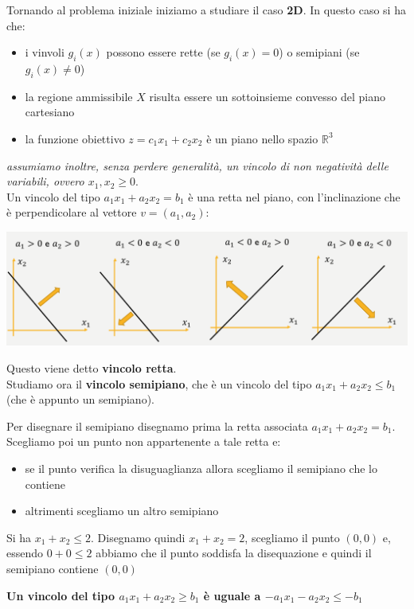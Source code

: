 \message{ !name(ro.tex)}\documentclass[a4paper,12pt, oneside]{book}
\begin{document}
Tornando al problema iniziale iniziamo a studiare il caso
\textbf{2D}. In questo caso si ha che:
\begin{itemize}
  \item i vinvoli $g_i(x)$ possono essere rette (se $g_i(x)=0$) o
  semipiani (se $g_i(x)\neq 0$)
  \item la regione ammissibile $X$ risulta essere un sottoinsieme
  convesso del piano cartesiano
  \item la funzione obiettivo $z=c_1x_1+c_2x_2$ è un piano nello
  spazio $\mathbb{R}^3$
\end{itemize}
\textit{assumiamo inoltre, senza perdere generalità, un vincolo di
  non negatività delle variabili, ovvero $x_1,x_2\geq 0$}.\\
Un vincolo del tipo $a_1x_1+a_2x_2=b_1$ è una retta nel piano, con
l'inclinazione che è perpendicolare al vettore $v=(a_1,a_2)$:
\begin{center}
  \includegraphics[scale = 0.7]{img/2d.png}
\end{center}
Questo viene detto \textbf{vincolo retta}.\\
Studiamo ora il \textbf{vincolo semipiano}, che è un vincolo del tipo
$a_1x_1+a_2x_2\leq b_1$ (che è appunto un semipiano).
\begin{shaded}
  Per disegnare il semipiano disegnamo prima la retta associata
  $a_1x_1+a_2x_2=b_1$. Scegliamo poi un punto non appartenente a tale
  retta e:
  \begin{itemize}
    \item se il punto verifica la disuguaglianza allora scegliamo il
    semipiano che lo contiene
    \item altrimenti scegliamo un altro semipiano
  \end{itemize}
  \begin{esempio}
    Si ha $x_1+x_2\leq 2$. Disegnamo quindi $x_1+x_2=2$, scegliamo il
    punto $(0,0)$ e, essendo $0+0\leq 2$ abbiamo che il punto soddisfa
    la disequazione e quindi il semipiano contiene $(0,0)$
  \end{esempio}
  \textbf{Un vincolo del tipo $a_1x_1+a_2x_2\geq b_1$ è uguale a
    $-a_1x_1-a_2x_2\leq -b_1$}
\end{shaded}
\end{document}
